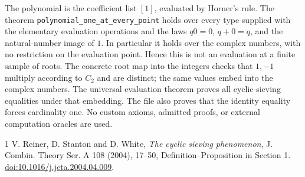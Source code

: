 \documentclass[11pt]{article}
\begin{document}
The polynomial is the coefficient list $[1]$, evaluated by Horner's
rule. The theorem \texttt{polynomial\_\allowbreak{}one\_\allowbreak{}at\_\allowbreak{}every\_\allowbreak{}point} holds
over every type supplied with the elementary evaluation operations
and the laws $q0=0$, $q+0=q$, and the natural-number image of $1$.
In particular it holds over the complex numbers, with no restriction
on the evaluation point. Hence this is not an evaluation at a finite
sample of roots. The concrete root map into the integers checks
that $1,-1$ multiply according to $C_2$ and are distinct; the same
values embed into the complex numbers. The universal evaluation
theorem proves all cyclic-sieving equalities under that embedding.
The file also proves that the identity equality forces cardinality
one. No custom axioms, admitted proofs, or external computation
oracles are used.

\begin{thebibliography}{1}
 V. Reiner, D. Stanton and D. White,
\emph{The cyclic sieving phenomenon}, J. Combin. Theory Ser. A
108 (2004), 17--50, Definition--Proposition in Section 1.
\href{https://doi.org/10.1016/j.jcta.2004.04.009}{doi:10.1016/j.jcta.2004.04.009}.
\end{thebibliography}
\end{document}
